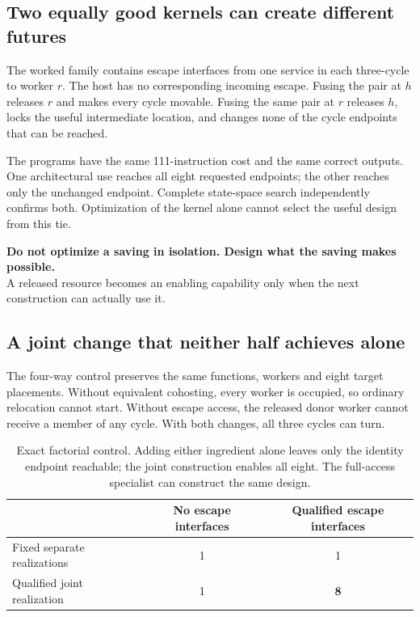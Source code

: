 \documentclass[11pt,letterpaper]{article}
\theoremstyle{definition}\newtheorem{definition}[theorem]{Definition}
\theoremstyle{remark}\newtheorem{remark}[theorem]{Remark}
\begin{document}
\subsection{Two equally good kernels can create different futures}
The worked family contains escape interfaces from one service in each three-cycle to worker $r$. The host has no corresponding incoming escape. Fusing the pair at $h$ releases $r$ and makes every cycle movable. Fusing the same pair at $r$ releases $h$, locks the useful intermediate location, and changes none of the cycle endpoints that can be reached.

The programs have the same 111-instruction cost and the same correct outputs. One architectural use reaches all eight requested endpoints; the other reaches only the unchanged endpoint. Complete state-space search independently confirms both. Optimization of the kernel alone cannot select the useful design from this tie.

\begin{thesis}
\textbf{Do not optimize a saving in isolation. Design what the saving makes possible.}\\[.25em]
A released resource becomes an enabling capability only when the next construction can actually use it.
\end{thesis}

\subsection{A joint change that neither half achieves alone}
The four-way control preserves the same functions, workers and eight target placements. Without equivalent cohosting, every worker is occupied, so ordinary relocation cannot start. Without escape access, the released donor worker cannot receive a member of any cycle. With both changes, all three cycles can turn.

\begin{table}[htbp]\centering\small
\caption{Exact factorial control. Adding either ingredient alone leaves only the identity endpoint reachable; the joint construction enables all eight. The full-access specialist can construct the same design.}
\begin{tabularx}{\linewidth}{@{}Ycc@{}}\toprule
 & No escape interfaces & Qualified escape interfaces\\\midrule
Fixed separate realizations & 1 & 1\\
Qualified joint realization & 1 & \textbf{8}\\\bottomrule
\end{tabularx}
\label{tab:factorial}
\end{table}
\end{document}
